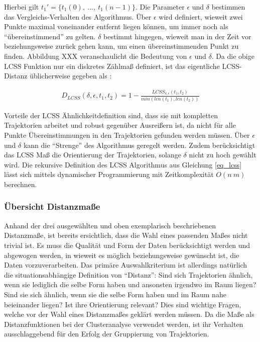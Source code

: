 Hierbei gilt $t_1' = \{ t_1(0),\ ...,\ t_1(n-1)\}$. Die Parameter $\epsilon$ und $\delta$ bestimmen das
Vergleichs-Verhalten des Algorithmus. Über $\epsilon$ wird definiert, wieweit zwei Punkte maximal voneinander entfernt liegen
können, um immer noch als ``übereinstimmend'' zu gelten. $\delta$ bestimmt hingegen, wieweit man in der Zeit vor
beziehungsweise zurück gehen kann, um einen
übereinstimmenden Punkt zu finden. Abbildung XXX veranschaulicht die Bedeutung von $\epsilon$ und $\delta$.
Da die obige LCSS Funktion nur ein diskretes Zählmaß definiert, ist das eigentliche LCSS-Distanz üblicherweise
gegeben als \cite[]{Vlachos2002}:

\begin{ceqn}
\begin{align}
\label{eq_lcss_distance}
    D_{LCSS}(\delta, \epsilon, t_1, t_2) = 1 - \frac{LCSS_{\delta, \epsilon}(t_1, t_2)}{min(len(t_1), len(t_2))}
\end{align}
\end{ceqn}


Vorteile der LCSS Ähnlichkeitdefinition sind, dass sie mit kompletten Trajektorien arbeitet und robust
gegenüber Ausreißern ist, da nicht für alle Punkte Übereinstimmungen in den Trajektorien gefunden werden müssen.
Über $\epsilon$ und $\delta$ kann die ``Strenge'' des Algorithmus geregelt werden.
Zudem berücksichtigt das LCSS Maß die Orientierung der Trajektorien, solange $\delta$ nicht zu hoch gewählt wird.
Die rekursive Definition des LCSS Algorithmus aus Gleichung \ref{eq_lcss} lässt sich mittels dynamischer Programmierung
mit Zeitkomplexität $O(n\ m)$ berechnen.

\subsubsection{Übersicht Distanzmaße}

Anhand der drei ausgewählten und oben exemplarisch beschriebenen Distanzmaße, ist bereits ersichtlich,
dass die Wahl eines passenden Maßes nicht trivial ist. Es muss die Qualität und Form der Daten berücksichtigt werden
und abgewogen werden, in wieweit es möglich beziehungsweise gewünscht ist, die Daten vorzuverarbeiten.
Das primäre Auswahlkriterium ist allerdings natürlich die situationsabhängige Definition von ``Distanz'':
Sind sich Trajektorien ähnlich, wenn sie lediglich die selbe Form haben und ansonsten irgendwo im Raum liegen? Sind sie
sich ähnlich, wenn sie die selbe Form haben und im Raum nahe beieinander liegen? Ist ihre Orientierung relevant?
Dies sind wichtige Fragen, welche vor der Wahl eines Distanzmaßes geklärt werden müssen.
Da die Maße als Distanzfunktionen bei der Clusteranalyse verwendet werden, ist ihr Verhalten ausschlaggebend
für den Erfolg der Gruppierung von Trajektorien.

